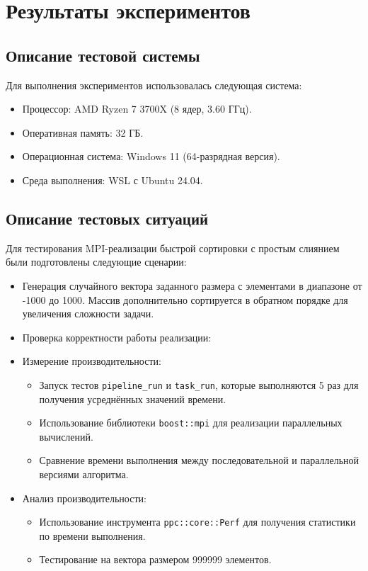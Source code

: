 \documentclass[12pt]{article}
\begin{document}
\section*{Результаты экспериментов}

\subsection*{Описание тестовой системы}
Для выполнения экспериментов использовалась следующая система:
\begin{itemize}
    \item Процессор: AMD Ryzen 7 3700X (8 ядер, 3.60 ГГц).
    \item Оперативная память: 32 ГБ.
    \item Операционная система: Windows 11 (64-разрядная версия).
    \item Среда выполнения: WSL с Ubuntu 24.04.
\end{itemize}

\subsection*{Описание тестовых ситуаций}
Для тестирования MPI-реализации быстрой сортировки с простым слиянием были подготовлены следующие сценарии:
\begin{itemize}
    \item Генерация случайного вектора заданного размера с элементами в диапазоне от -1000 до 1000. Массив дополнительно сортируется в обратном порядке для увеличения сложности задачи.
    \item Проверка корректности работы реализации:
    \item Измерение производительности:
    \begin{itemize}
        \item Запуск тестов \texttt{pipeline\_run} и \texttt{task\_run}, которые выполняются 5 раз для получения усреднённых значений времени.
        \item Использование библиотеки \texttt{boost::mpi} для реализации параллельных вычислений.
        \item Сравнение времени выполнения между последовательной и параллельной версиями алгоритма.
    \end{itemize}
    \item Анализ производительности:
    \begin{itemize}
        \item Использование инструмента \texttt{ppc::core::Perf} для получения статистики по времени выполнения.
        \item Тестирование на вектора размером 999999 элементов.
    \end{itemize}
\end{itemize}
\end{document}
